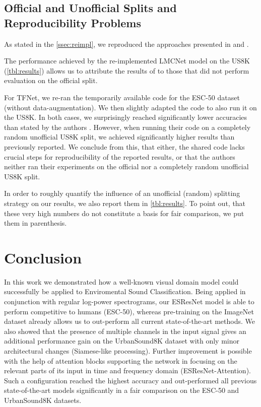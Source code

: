 \documentclass[a4paper,conference]{IEEEtran}
\begin{document}
\subsection{Official and Unofficial Splits and Reproducibility Problems} \label{ssec:off_vs_unoff}

As stated in the \autoref{ssec:reimpl}, we reproduced the approaches presented in \cite{su2019tscnnds} and \cite{wang2019tfnet}.

The performance achieved by the re-implemented \mbox{LMCNet} model on the US8K (\autoref{tbl:results}) allows us to attribute the results of \cite{su2019tscnnds} to those that did not perform evaluation on the official split.

For TFNet, we re-ran the temporarily available code for the ESC-50 dataset (without data-augmentation).
We then slightly adapted the code to also run it on the US8K.
In both cases, we surprisingly reached significantly lower accuracies than stated by the authors \cite{wang2019tfnet}.
However, when running their code on a completely random unofficial US8K split, we achieved significantly higher results than previously reported.
We conclude from this, that either, the shared code lacks crucial steps for reproducibility of the reported results, or that the authors neither ran their experiments on the official nor a completely random unofficial US8K split.

In order to roughly quantify the influence of an unofficial (random) splitting strategy on our results, we also report them in \autoref{tbl:results}.
To point out, that these very high numbers do not constitute a basis for fair comparison, we put them in parenthesis.





\section{Conclusion} \label{sec:conc}
In this work we demonstrated how a well-known visual domain model could successfully be applied to Enviromental Sound Classification.
Being applied in conjunction with regular log-power spectrograms, our \mbox{ESResNet} model is able to perform competitive to humans (\mbox{ESC-50}), whereas pre-training on the \mbox{ImageNet} dataset already allows us to out-perform all current \mbox{state-of-the-art} methods.
We also showed that the presence of multiple channels in the input signal gives an additional performance gain on the \mbox{UrbanSound8K} dataset with only minor architectural changes (Siamese-like processing).
Further improvement is possible with the help of attention blocks supporting the network in focusing on the relevant parts of its input in time and frequency domain (\mbox{ESResNet-Attention}).
Such a configuration reached the highest accuracy and out-performed all previous \mbox{state-of-the-art} models significantly in a fair comparison on the ESC-50 and UrbanSound8K datasets.
\end{document}
